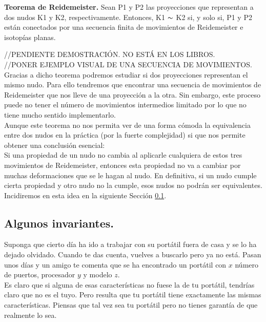 \documentclass[14pt]{extarticle}
\begin{document}
\begin{teo} \textbf{Teorema de Reidemeister.} Sean P1 y P2 las proyecciones que representan a dos nudos K1 y K2, respectivamente. Entonces, K1 $\thicksim$ K2 si, y solo si, P1 y P2 están conectados por una secuencia finita de movimientos de Reidemeister e isotopías planas.
\end{teo}
//PENDIENTE DEMOSTRACIÓN. NO ESTÁ EN LOS LIBROS.\\
//PONER EJEMPLO VISUAL DE UNA SECUENCIA DE MOVIMIENTOS. \\

Gracias a dicho teorema podremos estudiar si dos proyecciones representan el mismo nudo. Para ello tendremos que encontrar una secuencia de movimientos de Reidemeister que nos lleve de una proyección a la otra. Sin embargo, este proceso puede no tener el número de movimientos intermedios limitado por lo que no tiene mucho sentido implementarlo.\\
 
 Aunque este teorema no nos permita ver de una forma cómoda la equivalencia entre dos nudos en la práctica (por la fuerte complejidad) si que nos permite obtener una conclusión esencial:\\
 
 Si una propiedad de un nudo no cambia al aplicarle cualquiera de estos tres movimientos de Reidemeister, entonces esta propiedad no va a cambiar por muchas deformaciones que se le hagan al nudo. En definitiva, si un nudo cumple cierta propiedad y otro nudo no la cumple, esos nudos no podrán ser equivalentes. Incidiremos en esta idea en la siguiente Sección \ref{seccion5}.
 
  

\newpage
\subsection{Algunos invariantes.}\label{seccion5}
Suponga que cierto día ha ido a trabajar con su portátil fuera de casa y se lo ha dejado olvidado. Cuando te das cuenta, vuelves a buscarlo pero ya no está. Pasan unos días y un amigo te comenta que se ha encontrado un portátil con $x$ número de puertos, procesador $y$ y modelo $z$.\\

Es claro que si alguna de esas características no fuese la de tu portátil, tendrías claro que no es el tuyo. Pero resulta que tu portátil tiene exactamente las mismas características. Piensas que tal vez sea tu portátil pero no tienes garantía de que realmente lo sea. \\
\end{document}
